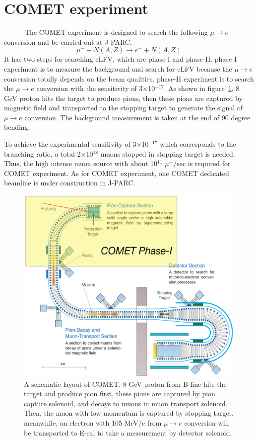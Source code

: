 \section{COMET experiment}
~~~~~~The COMET experiment is designed to search the following $\mu \rightarrow e$ conversion and be carried out at J-PARC.
\begin{equation}
 \mu^- + N(A, Z) \rightarrow e^- + N(A, Z)
\end{equation}
It has two steps for searching cLFV, which are phase-I and phase-II.
phase-I experiment is to measure the background and search for cLFV because the $\mu \rightarrow e$ conversion totally depends on the beam qualities.
phase-II experiment is to search the $\mu \rightarrow e$ conversion with the sensitivity of 3$\times$10$^{-17}$.
As shown in figure~\ref{comet}, 8 GeV proton hits the target to produce pions, then these pions are captured by magnetic field and transported to the stopping target to generate the signal of $\mu \rightarrow e$ conversion.
The background measurement is taken at the end of 90 degree bending.

To achieve the experimental sensitivity of 3$\times$10$^{-17}$ which corresponds to the branching ratio, a total 2$\times$10$^{18}$ muons stopped in stopping target is needed.
Thus, the high intense muon source with about 10$^{11}$ $\mu^-$/sec is required for COMET experiment.
As for COMET experiment, one COMET dedicated beamline is under construction in J-PARC.
\begin{figure}[H]
 \centering
 \includegraphics[scale=0.55]{chapter1/fig/comet.pdf}
 \caption{A schematic layout of COMET. 8 GeV proton from B-line hits the target and produce pion first, these pions are captured by pion capture solenoid, and decays to muons in muon transport solenoid. Then, the muon with low momentum is captured by stopping target, meanwhile, an electron with 105 MeV/c from $\mu \rightarrow e$ conversion will be transported to E-cal to take a measurement by detector solenoid.}
\label{comet}
\end{figure}

